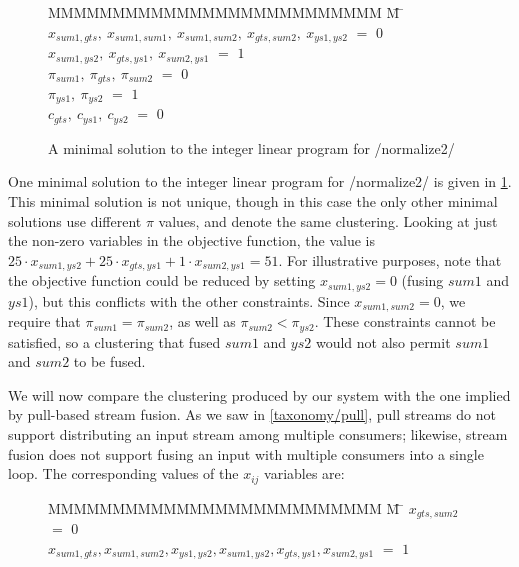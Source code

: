 \begin{figure}
\begin{tabbing}
MMMMMMMMMMMMMMMMMMMMMMMMMM \= M \= \kill
$x_{sum1, gts},~ x_{sum1, sum1},~ x_{sum1, sum2},~ x_{gts, sum2},~ x_{ys1,  ys2}$
    \> $=$ \> $0$ \\
$x_{sum1, ys2},~ x_{gts, ys1},~   x_{sum2, ys1}$
    \> $=$ \> $1$ 
\\[1ex]
$\pi_{sum1},~ \pi_{gts },~ \pi_{sum2}$
    \> $=$ \> $0$ \\
$\pi_{ys1 },~ \pi_{ys2 }$
    \> $=$ \> $1$ 
\\[1ex]
$c_{gts},~ c_{ys1},~ c_{ys2}$           
    \> $=$ \> $0$
\end{tabbing}
\caption{A minimal solution to the integer linear program for \Hs/normalize2/}
\label{fig:clustering:normalize2-ilp-sol}
\end{figure}

One minimal solution to the integer linear program for \Hs/normalize2/ is given in \cref{fig:clustering:normalize2-ilp-sol}.
This minimal solution is not unique, though in this case the only other minimal solutions use different $\pi$ values, and denote the same clustering.
Looking at just the non-zero variables in the objective function, the value is $25 \cdot x_{sum1,ys2} + 25 \cdot x_{gts,ys1} + 1 \cdot x_{sum2, ys1} = 51$.
For illustrative purposes, note that the objective function could be reduced by setting $x_{sum1,ys2} = 0$ (fusing $sum1$ and $ys1$), but this conflicts with the other constraints.
Since $x_{sum1, sum2} = 0$, we require that $\pi_{sum1} = \pi_{sum2}$, as well as \mbox{$\pi_{sum2} < \pi_{ys2}$}.
These constraints cannot be satisfied, so a clustering that fused $sum1$ and $ys2$ would not also permit $sum1$ and $sum2$ to be fused.

We will now compare the clustering produced by our system with the one implied by pull-based stream fusion.
As we saw in \cref{taxonomy/pull}, pull streams do not support distributing an input stream among multiple consumers; likewise, stream fusion does not support fusing an input with multiple consumers into a single loop.
The corresponding values of the $x_{ij}$ variables are:

\begin{figure}[h!]
\begin{tabbing}
MMMMMMMMMMMMMMMMMMMMMMMMMM \= M \= \kill
$x_{gts, sum2}$
    \> $=$ \> $0$ \\
$x_{sum1, gts}, x_{sum1, sum2}, x_{ys1,  ys2}, x_{sum1, ys2}, x_{gts, ys1 }, x_{sum2, ys1}$
    \> $=$ \> $1$
\end{tabbing}
\end{figure}

